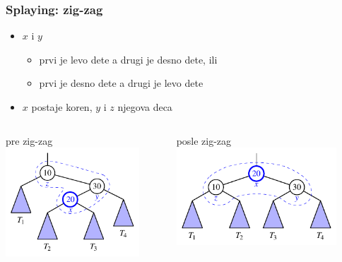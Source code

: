 \documentclass[compress,aspectratio=169]{beamer}
\begin{document}
\begin{frame}[fragile]
  \frametitle{Splaying: zig-zag}
  \begin{itemize}
    \item $x$ i $y$ 
    \begin{itemize}
      \item prvi je levo dete a drugi je desno dete, ili
      \item prvi je desno dete a drugi je levo dete
    \end{itemize}
    \item $x$ postaje koren, $y$ i $z$ njegova deca
  \end{itemize}
  \begin{columns}
    \begin{column}[t]{6cm}
      \begin{center}
        pre zig-zag 
        \includegraphics[width=5cm]{asp-11-pic19a.pdf}
      \end{center}
    \end{column}  
    \begin{column}[t]{6cm}
      \begin{center}
        posle zig-zag
        \includegraphics[width=6cm]{asp-11-pic19b.pdf}
      \end{center}
    \end{column}  
  \end{columns}
\end{frame}
\end{document}
